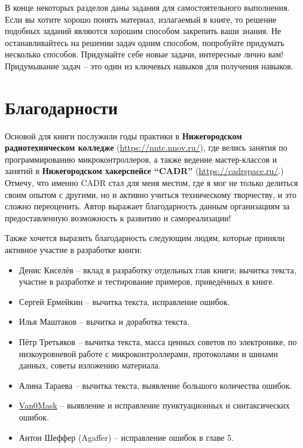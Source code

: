 \documentclass[../sparc.tex]{subfiles}
\begin{document}
В конце некоторых разделов даны задания для самостоятельного выполнения.  Если
вы хотите хорошо понять материал, излагаемый в книге, то решение подобных
заданий являются хорошим способом закрепить ваши знания.  Не останавливайтесь на
решении задач одним способом, попробуйте придумать несколько способов.
Придумайте себе новые задачи, интересные лично вам!  Придумывание задач -- это
один из ключевых навыков для получения навыков.

\section*{Благодарности}

Основой для книги послужили годы практики в \textbf{Нижегородском
  радиотехническом колледже} (\url{https://nntc.nnov.ru/}), где велись занятия
по программированию микроконтроллеров, а также ведение мастер-классов и занятий
в \textbf{Нижегородском хакерспейсе ``CADR''} (\url{https://cadrspace.ru/}.)
Отмечу, что именно CADR стал для меня местом, где я мог не только делиться своим
опытом с другими, но и активно учиться техническому творчеству, и это сложно
переоценить.  Автор выражает благодарность данным организациям за
предоставленную возможность к развитию и самореализации!

Также хочется выразить благодарность следующим людям, которые приняли активное
участие в разработке книги:
\begin{itemize}
\item Денис Киселёв -- вклад в разработку отдельных глав книги; вычитка текста,
  участие в разработке и тестирование примеров, приведённых в книге.
\item Сергей Ермейкин -- вычитка текста, исправление ошибок.
\item Илья Маштаков – вычитка и доработка текста.
\item Пётр Третьяков -- вычитка текста, масса ценных советов по электронике,
  по низкоуровневой работе с микроконтроллерами, протоколами и шинами данных,
  советы изложению материала.
\item Алина Тараева -- вычитка текста, выявление большого количества ошибок.
\item \href{https://github.com/V4n0M4sk}{Van0Mask} -- выявление и исправление
  пунктуационных и синтаксических ошибок.
\item Антон Шеффер (Agaffer) -- исправление ошибок в главе 5.
\end{itemize}
\end{document}
